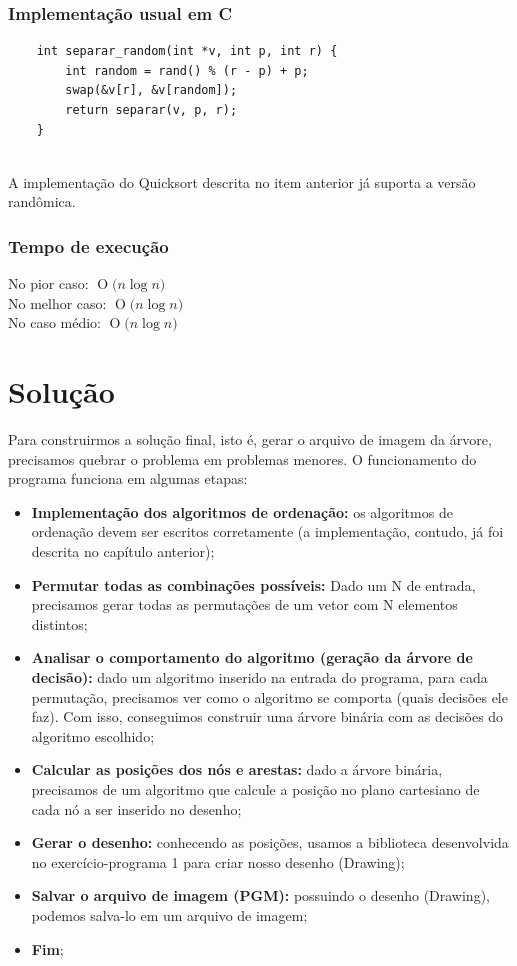 \documentclass[12pt,a4paper]{article}
\newcommand{\BigO}[1]{\ensuremath{\operatorname{O}\bigl(#1\bigr)}}
\begin{document}
	\subsubsection{Implementação usual em C}
	\begin{minipage}{\linewidth}
	\begin{lstlisting}
	int separar_random(int *v, int p, int r) {
		int random = rand() % (r - p) + p;
		swap(&v[r], &v[random]);
		return separar(v, p, r);
	}
	\end{lstlisting}
	\end{minipage}\\
	\indent A implementação do Quicksort descrita no item anterior já suporta a versão randômica.

	\subsubsection{Tempo de execução}
	\indent No pior caso: \BigO{n\log{}n}\\
	\indent No melhor caso: \BigO{n\log{}n}\\
	\indent No caso médio: \BigO{n\log{}n}







	\section{Solução}
	\indent Para construirmos a solução final, isto é, gerar o arquivo de imagem da árvore, precisamos quebrar o problema em problemas menores. O funcionamento do programa funciona em algumas etapas:

	\begin{itemize}
	\item \textbf{Implementação dos algoritmos de ordenação:} os algoritmos de ordenação devem ser escritos corretamente (a implementação, contudo, já foi descrita no capítulo anterior);
	\item \textbf{Permutar todas as combinações possíveis:} Dado um N de entrada, precisamos gerar todas as permutações de um vetor com N elementos distintos;
	\item \textbf{Analisar o comportamento do algoritmo (geração da árvore de decisão):} dado um algoritmo inserido na entrada do programa, para cada permutação, precisamos ver como o algoritmo se comporta (quais decisões ele faz). Com isso, conseguimos construir uma árvore binária com as decisões do algoritmo escolhido;
	\item \textbf{Calcular as posições dos nós e arestas:} dado a árvore binária, precisamos de um algoritmo que calcule a posição no plano cartesiano de cada nó a ser inserido no desenho;
	\item \textbf{Gerar o desenho:} conhecendo as posições, usamos a biblioteca desenvolvida no exercício-programa 1 para criar nosso desenho (Drawing);
	\item \textbf{Salvar o arquivo de imagem (PGM):} possuindo o desenho (Drawing), podemos salva-lo em um arquivo de imagem;
	\item \textbf{Fim};
	\end{itemize}
\end{document}
